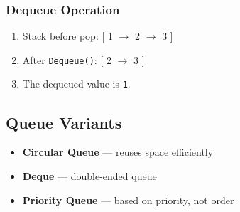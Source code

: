 \subsubsection*{Dequeue Operation}
\begin{enumerate}
    \item Stack before pop: [ 1 $\rightarrow$ 2 $\rightarrow$ 3 ]
    \item After \texttt{Dequeue()}: [ 2 $\rightarrow$ 3 ]
    \item The dequeued value is \texttt{1}.
\end{enumerate}

\subsection{Queue Variants}

\begin{itemize}[itemsep=0.5em]
    \item \textbf{Circular Queue} — reuses space efficiently
    \item \textbf{Deque} — double-ended queue
    \item \textbf{Priority Queue} — based on priority, not order
\end{itemize}